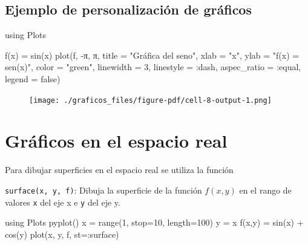 \documentclass[
  letterpaper,
  DIV=11,
  numbers=noendperiod]{scrreprt}
\newenvironment{Shaded}{\begin{snugshade}}{\end{snugshade}}
\newcommand{\BuiltInTok}[1]{\textcolor[rgb]{0.00,0.23,0.31}{#1}}
\newcommand{\ConstantTok}[1]{\textcolor[rgb]{0.56,0.35,0.01}{#1}}
\newcommand{\FloatTok}[1]{\textcolor[rgb]{0.68,0.00,0.00}{#1}}
\newcommand{\FunctionTok}[1]{\textcolor[rgb]{0.28,0.35,0.67}{#1}}
\newcommand{\ImportTok}[1]{\textcolor[rgb]{0.00,0.46,0.62}{#1}}
\newcommand{\NormalTok}[1]{\textcolor[rgb]{0.00,0.23,0.31}{#1}}
\newcommand{\OperatorTok}[1]{\textcolor[rgb]{0.37,0.37,0.37}{#1}}
\newcommand{\StringTok}[1]{\textcolor[rgb]{0.13,0.47,0.30}{#1}}
\begin{document}
\hypertarget{ejemplo-de-personalizaciuxf3n-de-gruxe1ficos}{%
\subsection{Ejemplo de personalización de
gráficos}\label{ejemplo-de-personalizaciuxf3n-de-gruxe1ficos}}

\begin{Shaded}
\begin{Highlighting}[]
\ImportTok{using} \BuiltInTok{Plots}

\FunctionTok{f}\NormalTok{(x) }\OperatorTok{=} \FunctionTok{sin}\NormalTok{(x)}
\FunctionTok{plot}\NormalTok{(f, }\OperatorTok{{-}}\ConstantTok{π}\NormalTok{, }\ConstantTok{π}\NormalTok{, title }\OperatorTok{=} \StringTok{"Gráfica del seno"}\NormalTok{,  xlab }\OperatorTok{=} \StringTok{"x"}\NormalTok{, ylab }\OperatorTok{=} \StringTok{"f(x) = sen(x)"}\NormalTok{,}
\NormalTok{  color }\OperatorTok{=} \StringTok{"green"}\NormalTok{, linewidth }\OperatorTok{=} \FloatTok{3}\NormalTok{, linestyle }\OperatorTok{=} \OperatorTok{:}\NormalTok{dash, aspec\_ratio }\OperatorTok{=} \OperatorTok{:}\NormalTok{equal, legend }\OperatorTok{=} \ConstantTok{false}\NormalTok{)}
\end{Highlighting}
\end{Shaded}

\begin{figure}[H]

{\centering \texttt{[image: ./graficos\_files/figure-pdf/cell-8-output-1.png]}

}

\end{figure}

\hypertarget{gruxe1ficos-en-el-espacio-real}{%
\section{Gráficos en el espacio
real}\label{gruxe1ficos-en-el-espacio-real}}

Para dibujar superficies en el espacio real se utiliza la función

\texttt{surface(x,\ y,\ f)}: Dibuja la superficie de la función
\(f(x,y)\) en el rango de valores \texttt{x} del eje x e \texttt{y} del
eje y.

\begin{Shaded}
\begin{Highlighting}[]
\ImportTok{using} \BuiltInTok{Plots}
\FunctionTok{pyplot}\NormalTok{()}
\NormalTok{x }\OperatorTok{=} \FunctionTok{range}\NormalTok{(}\FloatTok{1}\NormalTok{, stop}\OperatorTok{=}\FloatTok{10}\NormalTok{, length}\OperatorTok{=}\FloatTok{100}\NormalTok{)}
\NormalTok{y }\OperatorTok{=}\NormalTok{ x}
\FunctionTok{f}\NormalTok{(x,y) }\OperatorTok{=} \FunctionTok{sin}\NormalTok{(x) }\OperatorTok{+} \FunctionTok{cos}\NormalTok{(y)}
\FunctionTok{plot}\NormalTok{(x, y, f, st}\OperatorTok{=:}\NormalTok{surface)}
\end{Highlighting}
\end{Shaded}
\end{document}

